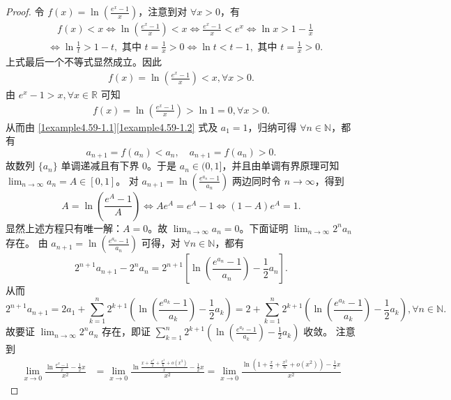 \documentclass[../../main.tex]{subfiles}%
\begin{document}
\begin{proof}
令 \(f(x)=\ln\left(\frac{e^x - 1}{x}\right)\)，注意到对 \(\forall x > 0\)，有
\begin{align*}
& \quad f(x) < x \Leftrightarrow \ln\left(\frac{e^x - 1}{x}\right) < x \Leftrightarrow \frac{e^x - 1}{x} < e^x \Leftrightarrow \ln x > 1 - \frac{1}{x}\\
&\Leftrightarrow \ln\frac{1}{t} > 1 - t,\text{ 其中 }t = \frac{1}{x} > 0 \Leftrightarrow \ln t < t - 1,\text{ 其中 }t = \frac{1}{x} > 0.
\end{align*}
上式最后一个不等式显然成立。因此
\begin{align}
f(x)=\ln\left(\frac{e^x - 1}{x}\right) < x,\forall x > 0. \label{1example4.59-1.1}  
\end{align}
由 \(e^x - 1 > x,\forall x \in \mathbb{R}\) 可知
\begin{align}
f(x)=\ln\left(\frac{e^x - 1}{x}\right) > \ln 1 = 0,\forall x > 0. \label{1example4.59-1.2}
\end{align}
从而由 \eqref{1example4.59-1.1}\eqref{1example4.59-1.2} 式及 \(a_1 = 1\)，归纳可得 \(\forall n \in \mathbb{N}\)，都有
\[
a_{n + 1} = f(a_n) < a_n,\quad a_{n + 1} = f(a_n) > 0.
\]
故数列 \(\{ a_n \}\) 单调递减且有下界 \(0\)。于是 \(a_n \in (0, 1]\)，并且由单调有界原理可知 \(\lim_{n \to \infty} a_n = A \in [0, 1]\)。
对 \(a_{n + 1} = \ln\left(\frac{e^{a_n} - 1}{a_n}\right)\) 两边同时令 \(n \to \infty\)，得到
\[
A = \ln\left(\frac{e^A - 1}{A}\right) \Leftrightarrow Ae^A = e^A - 1 \Leftrightarrow (1 - A)e^A = 1.
\]
显然上述方程只有唯一解：\(A = 0\)。故 \(\lim_{n \to \infty} a_n = 0\)。下面证明 \(\lim_{n \to \infty} 2^n a_n\) 存在。
由 \(a_{n + 1} = \ln\left(\frac{e^{a_n} - 1}{a_n}\right)\) 可得，对 \(\forall n \in \mathbb{N}\)，都有
\[
2^{n + 1} a_{n + 1} - 2^n a_n = 2^{n + 1}\left[\ln\left(\frac{e^{a_n} - 1}{a_n}\right) - \frac{1}{2} a_n\right].
\]
从而
\[
2^{n + 1} a_{n + 1} = 2a_1 + \sum_{k = 1}^n 2^{k + 1}\left(\ln\left(\frac{e^{a_k} - 1}{a_k}\right) - \frac{1}{2} a_k\right) = 2 + \sum_{k = 1}^n 2^{k + 1}\left(\ln\left(\frac{e^{a_k} - 1}{a_k}\right) - \frac{1}{2} a_k\right),\forall n \in \mathbb{N}.
\]
故要证 \(\lim_{n \to \infty} 2^n a_n\) 存在，即证 \(\sum_{k = 1}^n 2^{k + 1}\left(\ln\left(\frac{e^{a_k} - 1}{a_k}\right) - \frac{1}{2} a_k\right)\) 收敛。
注意到
\begin{align*}
\lim_{x\rightarrow 0} \frac{\ln \frac{e^x-1}{x}-\frac{1}{2}x}{x^2}&=\lim_{x\rightarrow 0} \frac{\ln \frac{x+\frac{x^2}{2}+\frac{x^3}{6}+o(x^3)}{x}-\frac{1}{2}x}{x^2}=\lim_{x\rightarrow 0} \frac{\ln \left( 1+\frac{x}{2}+\frac{x^2}{6}+o(x^2) \right) -\frac{1}{2}x}{x^2}

\end{align*}
\end{proof}
\end{document}
